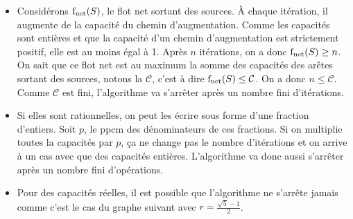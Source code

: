 \begin{solution}
  \begin{itemize}
    \item
      Considérons $\operatorname{f_\mathrm{net}}(S)$, le flot net sortant des sources.
      À chaque itération, il augmente de la capacité du chemin d'augmentation.
      Comme les capacités sont entières et que la capacité d'un chemin d'augmentation est strictement positif,
      elle est au moins égal à 1.
      Après $n$ itérations, on a donc $\operatorname{f_\mathrm{net}}(S) \geq n$.
      On sait que ce flot net est au maximum la somme des capacités des arêtes sortant des sources, notons la $\mathcal{C}$,
      c'est à dire $\operatorname{f_\mathrm{net}}(S) \leq \mathcal{C}$.
      On a donc $n \leq \mathcal{C}$. Comme $\mathcal{C}$ est fini, l'algorithme va s'arrêter après un nombre fini d'itérations.
    \item
      Si elles sont rationnelles, on peut les écrire sous forme d'une fraction d'entiers.
      Soit $p$, le ppcm des dénominateurs de ces fractions.
      Si on multiplie toutes la capacités par $p$, ça ne change pas le nombre d'itérations
      et on arrive à un cas avec que des capacités entières.
      L'algorithme va donc aussi s'arrêter après un nombre fini d'opérations.
    \item
      Pour des capacités réelles, il est possible que l'algorithme ne s'arrête jamais comme c'est le cas du
      graphe suivant avec $r = \frac{\sqrt{5} - 1}{2}$.
      \begin{center}
      \end{center}


\end{itemize}
\end{solution}
